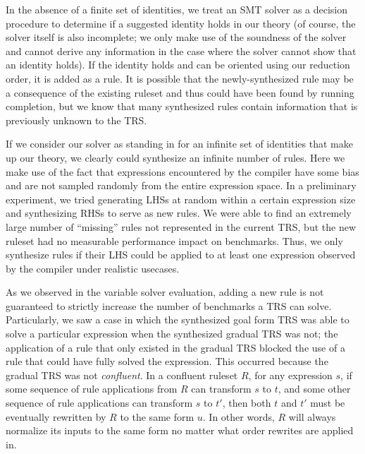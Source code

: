 In the absence of a finite set of identities, we
treat an SMT solver as a decision procedure to determine if a suggested identity 
holds in our theory (of course, the solver itself is also incomplete; we only make use of the 
soundness of the solver and cannot derive any information in the case where the solver cannot
show that an identity holds). If the identity holds and can be oriented using our reduction order, 
it is added as a rule. It is possible that the newly-synthesized rule may be a consequence 
of the existing ruleset and thus could have been found by running completion, 
but we know that many synthesized rules contain information that is previously 
unknown to the TRS.

If we consider our solver as standing in for an infinite set of identities that make up
our theory, we clearly could synthesize an infinite number of rules. Here we make use
of the fact that expressions encountered by the compiler have some bias 
and are not sampled randomly from the entire expression space. In a preliminary 
experiment, we tried generating LHSs at random within a certain expression size and 
synthesizing RHSs to serve as new rules. We were able to find an extremely large number of 
``missing'' rules not represented in the current TRS, but the new ruleset had 
no measurable performance impact on benchmarks. Thus, we only synthesize rules if their LHS could be 
applied to at least one expression observed by the compiler under realistic usecases. %



As we observed in the variable solver evaluation, adding a new rule is not guaranteed to strictly increase the number of benchmarks a TRS can solve. Particularly, we saw a case in which the synthesized goal form TRS was able to solve a particular expression when the synthesized gradual TRS was not; the application of a rule that only existed in the gradual TRS blocked the use of a rule that could have fully solved the expression. This occurred because the gradual TRS was not \emph{confluent}. In a confluent ruleset $R$, for any expression $s$, if some sequence of rule applications from $R$ can transform $s$ to $t$, and some other sequence of rule applications can transform $s$ to $t'$, then both $t$ and $t'$ must be eventually rewritten by $R$ to the same form $u$. In other words, $R$ will always normalize its inputs to the same form no matter what order rewrites are applied in. 

